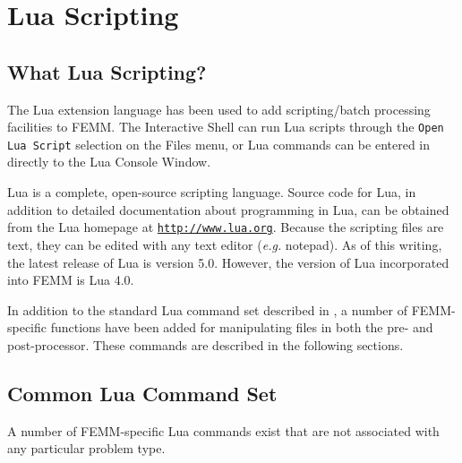 
\chapter{Lua Scripting}

\section{What Lua Scripting?}

The Lua extension language has been used to add scripting/batch
processing facilities to FEMM. The Interactive Shell can run Lua scripts
through the {\tt Open Lua Script} selection on the Files menu, or Lua commands can be
entered in directly to the Lua Console Window.

Lua is a complete, open-source scripting language.  Source code for
Lua, in addition to detailed documentation about programming in
Lua, can be obtained from the Lua homepage at
\href{http://www.lua.org}{\tt http://www.lua.org}. 
Because the
scripting files are text, they can be edited with any text editor
({\em e.g.} notepad). As of this writing, the latest release of Lua
is version 5.0. However, the version of Lua incorporated into FEMM
is Lua 4.0.

In addition to the standard Lua command set described in \cite{luaman}, a number of
FEMM-specific functions have been added for manipulating files in
both the pre- and post-processor.  These commands are described in
the following sections.

\section{Common Lua Command Set}

A number of FEMM-specific Lua commands exist that are not
associated with any particular problem type.

